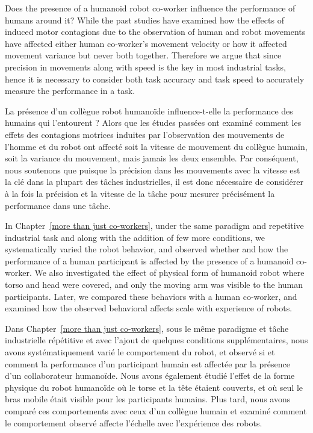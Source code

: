 Does the presence of a humanoid robot co-worker influence the performance of humans around it? While the past studies have examined how the effects of induced motor contagions due to the observation of human and robot movements have affected either human co-worker's movement velocity or how it affected movement variance but never both together. Therefore we argue that since precision in movements along with speed is the key in most industrial tasks, hence it is necessary to consider both task accuracy and task speed to accurately measure the performance in a task.

La présence d'un collègue robot humanoïde influence-t-elle la performance des humains qui l'entourent ? Alors que les études passées ont examiné comment les effets des contagions motrices induites par l'observation des mouvements de l'homme et du robot ont affecté soit la vitesse de mouvement du collègue humain, soit la variance du mouvement, mais jamais les deux ensemble. Par conséquent, nous soutenons que puisque la précision dans les mouvements avec la vitesse est la clé dans la plupart des tâches industrielles, il est donc nécessaire de considérer à la fois la précision et la vitesse de la tâche pour mesurer précisément la performance dans une tâche.




In Chapter~\ref{more than just co-workers}, under the same paradigm and repetitive industrial task and along with the addition of few more conditions, we systematically varied the robot behavior, and observed whether and how the performance of a human participant is affected by the presence of a humanoid co-worker. We also investigated the effect of physical form of humanoid robot where torso and head were covered, and only the moving arm was visible to the human participants. Later, we compared these behaviors with a human co-worker, and examined how the observed behavioral affects scale with experience of robots. 

Dans Chapter~\ref{more than just co-workers}, sous le même paradigme et tâche industrielle répétitive et avec l'ajout de quelques conditions supplémentaires, nous avons systématiquement varié le comportement du robot, et observé si et comment la performance d'un participant humain est affectée par la présence d'un collaborateur humanoïde. Nous avons également étudié l'effet de la forme physique du robot humanoïde où le torse et la tête étaient couverts, et où seul le bras mobile était visible pour les participants humains. Plus tard, nous avons comparé ces comportements avec ceux d'un collègue humain et examiné comment le comportement observé affecte l'échelle avec l'expérience des robots. 






